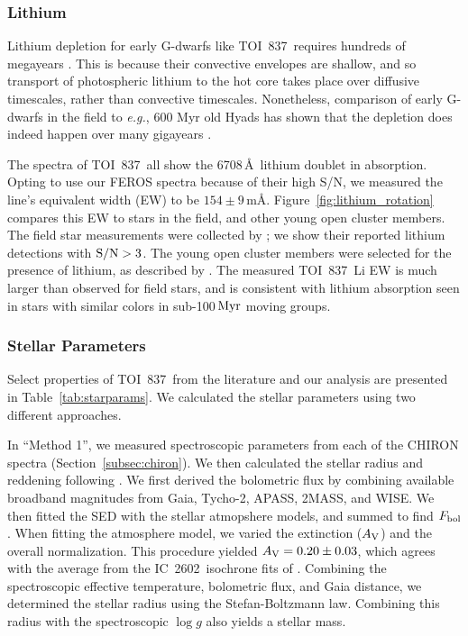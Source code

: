\documentclass[12pt,twocolumn,tighten]{aastex63}
\newcommand{\tn}{TOI~837} %
\newcommand{\cn}{IC~2602} %
\begin{document}
\subsubsection{Lithium}

Lithium depletion for early G-dwarfs like \tn\ requires hundreds of
megayears \citep{soderblom_ages_2014}. This is because their
convective envelopes are shallow, and so transport of photospheric
lithium to the hot core takes place over diffusive timescales, rather
than convective timescales.  Nonetheless, comparison of early G-dwarfs
in the field to {\it e.g.}, 600 Myr old Hyads has shown that the
depletion does indeed happen over many gigayears
\citep{berger_identifying_2018}.

The spectra of \tn\ all show the 6708$\,$\AA\ lithium doublet in
absorption. Opting to use our FEROS spectra because of their high S/N,
we measured the line's equivalent width (EW) to be $154 \pm 9 \,
$m\AA.  Figure~\ref{fig:lithium_rotation} compares this EW to stars in
the field, and other young open cluster members.  The field star
measurements were collected by \citet{berger_identifying_2018}; we
show their reported lithium detections with ${\rm S/N}>3$.  The young
open cluster members were selected for the presence of lithium, as
described by \citet{randich_gaiaeso_2018}.  The measured \tn\ Li EW is
much larger than observed for field stars, and is consistent with
lithium absorption seen in stars with similar colors in sub-100$\,{\rm
Myr}$ moving groups.


\subsubsection{Stellar Parameters}
\label{subsec:starparams}

Select properties of \tn\ from the literature and our analysis are
presented in Table~\ref{tab:starparams}.  We calculated the stellar
parameters using two different approaches.

In ``Method 1'', we measured spectroscopic parameters from each of the
CHIRON spectra (Section~\ref{subsec:chiron}).  We then calculated the
stellar radius and reddening following \citet{stassun_accurate_2017}.
We first derived the bolometric flux by combining available broadband
magnitudes from Gaia, Tycho-2, APASS, 2MASS, and WISE.  We then fitted
the SED with the \citet{kurucz_atlas12_2013} stellar atmopshere
models, and summed to find $F_{\rm bol}$.  When fitting the atmosphere
model, we varied the extinction ($A_{\rm V}$) and the overall
normalization.  This procedure yielded $A_{\rm V} = 0.20\pm0.03$,
which agrees with the average from the \cn\ isochrone fits of
\citet{randich_gaiaeso_2018}.  Combining the spectroscopic effective
temperature, bolometric flux, and Gaia distance, we determined the
stellar radius using the Stefan-Boltzmann law.  Combining this radius
with the spectroscopic $\log g$ also yields a stellar mass.
\end{document}
